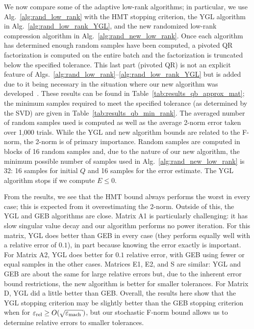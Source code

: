 We now compare some of the adaptive low-rank algorithms;
in particular, we use Alg.~\ref{alg:rand_low_rank} with the HMT
stopping criterion, the YGL algorithm in Alg.~\ref{alg:rand_low_rank_YGL},
and the new randomized low-rank compression algorithm
in Alg.~\ref{alg:rand_new_low_rank}.
Once each algorithm has determined enough random samples have been computed,
a pivoted QR factorization is computed on the entire batch
and the factorization is truncated below the specified tolerance.
This last part (pivoted QR) is not an explicit feature of
Algs.~\ref{alg:rand_low_rank}--\ref{alg:rand_low_rank_YGL} but is added
due to it being necessary in the situation where our new algorithm
was developed~\cite{randomHSSLBL}.
These results can be found in Table~\ref{tab:results_qb_approx_mat};
the minimum samples required to meet the specified tolerance
(as determined by the SVD) are given in Table~\ref{tab:results_qb_min_rank}.
The averaged number of random samples used is computed as well
as the average 2-norm error taken over 1,000 trials.
While the YGL and new algorithm bounds are related to the F-norm,
the 2-norm is of primary importance.
Random samples are computed in blocks of 16 random samples and,
due to the nature of our new algorithm, the minimum possible number of
samples used in Alg.~\ref{alg:rand_new_low_rank} is 32:
16 samples for initial $Q$ and 16 samples for the error estimate.
The YGL algorithm stops if we compute $E\le0$.

From the results, we see that the HMT bound always performs the worst
in every case; this is expected from it overestimating the 2-norm.
Outside of this, the YGL and GEB algorithms are close.
Matrix A1 is particularly challenging: it has slow singular value decay
and our algorithm performs no power iteration.
For this matrix, YGL does better than GEB in every case
(they perform equally well with a relative error of $0.1$), in part
because knowing the error exactly is important.
For Matrix A2, YGL does better for $0.1$ relative error, with GEB
using fewer or equal samples in the other cases.
Matrices E1, E2, and S are similar: YGL and GEB are about the same
for large relative errors but, due to the inherent error bound restrictions,
the new algorithm is better for smaller tolerances.
For Matrix D, YGL did a little better than GEB.
Overall, the results here show that the YGL stopping criterion
may be slightly better than the GEB stopping criterion when
for $\epsr\ge O(\sqrt{\epsm})$, but our stochastic F-norm bound allows us
to determine relative errors to smaller tolerances.

